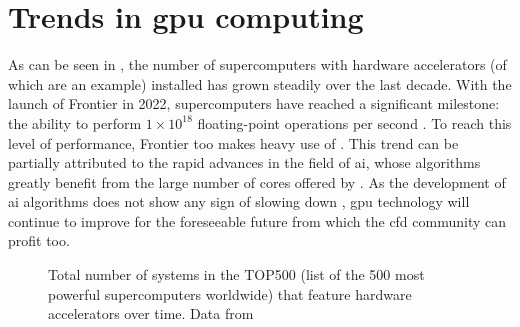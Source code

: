 \section{Trends in \acrshort{gpu} computing}
As can be seen in , the number of supercomputers with hardware accelerators (of which  are an example) installed has grown steadily over the last decade. With the launch of Frontier in 2022, supercomputers have reached a significant milestone: the ability to perform $1\times10^{18}$ floating-point operations per second \citep{choiBeatingHartWorld2022}. To reach this level of performance, Frontier too makes heavy use of . This trend can be partially attributed to the rapid advances in the field of \acrfull{ai}, whose algorithms greatly benefit from the large number of cores offered by . As the development of \acrshort{ai} algorithms does not show any sign of slowing down \citep{xuArtificialIntelligencePowerful2021}, \acrshort{gpu} technology will continue to improve for the foreseeable future from which the \acrshort{cfd} community can profit too. 

\begin{figure}[h!]
    \centering
    
    \caption{Total number of systems in the TOP500 (list of the 500 most powerful supercomputers worldwide) that feature hardware accelerators over time. Data from \citet{top500TOP500Lists2023}}
    \label{fig:top500_gpus}
\end{figure}